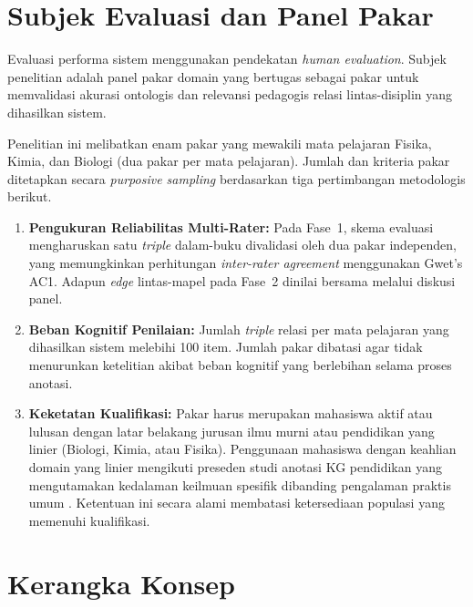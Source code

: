 \documentclass[main]{subfiles}
\begin{document}
\section{Subjek Evaluasi dan Panel Pakar}

Evaluasi performa sistem menggunakan pendekatan \textit{human
evaluation}. Subjek penelitian adalah panel pakar domain yang bertugas
sebagai pakar untuk memvalidasi akurasi ontologis dan
relevansi pedagogis relasi lintas-disiplin yang dihasilkan sistem.

Penelitian ini melibatkan enam pakar yang mewakili mata
pelajaran Fisika, Kimia, dan Biologi (dua pakar per mata
pelajaran). Jumlah dan kriteria pakar ditetapkan secara
\textit{purposive sampling} berdasarkan tiga pertimbangan metodologis
berikut.

\begin{enumerate}
  \item \textbf{Pengukuran Reliabilitas Multi-Rater:} Pada Fase~1, skema
        evaluasi mengharuskan satu \textit{triple} dalam-buku divalidasi
        oleh dua pakar independen, yang memungkinkan perhitungan
        \textit{inter-rater agreement} menggunakan Gwet's AC1. Adapun
        \textit{edge} lintas-mapel pada Fase~2 dinilai bersama melalui
        diskusi panel.

  \item \textbf{Beban Kognitif Penilaian:} Jumlah \textit{triple}
        relasi per mata pelajaran yang dihasilkan sistem melebihi 100
        item. Jumlah pakar dibatasi agar tidak menurunkan ketelitian
        akibat beban kognitif yang berlebihan selama proses anotasi.

  \item \textbf{Keketatan Kualifikasi:} Pakar harus
        merupakan mahasiswa aktif atau lulusan dengan latar belakang
        jurusan ilmu murni atau pendidikan yang linier (Biologi, Kimia,
        atau Fisika). Penggunaan mahasiswa dengan keahlian domain yang
        linier mengikuti preseden studi anotasi KG pendidikan yang
        mengutamakan kedalaman keilmuan spesifik dibanding pengalaman
        praktis umum \parencite{wei_kicgpt_2023}. Ketentuan ini secara alami
        membatasi ketersediaan populasi yang memenuhi kualifikasi.
\end{enumerate}

\section{Kerangka Konsep}\label{subsec:kerangka-konsep}
\end{document}
